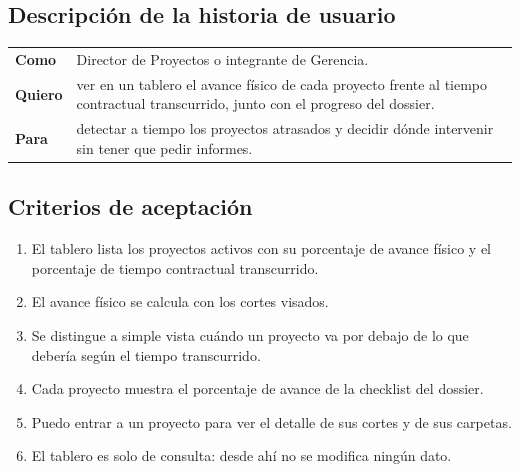 \documentclass[11pt]{article}
\begin{document}
\subsection*{Descripción de la historia de usuario}

\begin{tabular}{>{\bfseries}p{2.4cm} p{13.4cm}}
\toprule
Como & Director de Proyectos o integrante de Gerencia. \\
Quiero & ver en un tablero el avance físico de cada proyecto frente al tiempo contractual transcurrido, junto con el progreso del dossier. \\
Para & detectar a tiempo los proyectos atrasados y decidir dónde intervenir sin tener que pedir informes. \\
\bottomrule
\end{tabular}

\subsection*{Criterios de aceptación}

\begin{enumerate}
\item El tablero lista los proyectos activos con su porcentaje de avance físico y el porcentaje de tiempo contractual transcurrido.
\item El avance físico se calcula con los cortes visados.
\item Se distingue a simple vista cuándo un proyecto va por debajo de lo que debería según el tiempo transcurrido.
\item Cada proyecto muestra el porcentaje de avance de la checklist del dossier.
\item Puedo entrar a un proyecto para ver el detalle de sus cortes y de sus carpetas.
\item El tablero es solo de consulta: desde ahí no se modifica ningún dato.
\end{enumerate}
\end{document}
